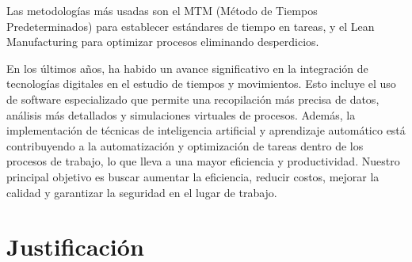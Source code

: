 \begin{itemize}
         Las metodologías más usadas son el MTM (Método de Tiempos Predeterminados) para establecer estándares de tiempo en tareas, y el Lean Manufacturing para optimizar procesos eliminando desperdicios.
        \cite{metodología}
        
         En los últimos años, ha habido un avance significativo en la integración de tecnologías digitales en el estudio de tiempos y movimientos. Esto incluye el uso de software especializado que permite una recopilación más precisa de datos, análisis más detallados y simulaciones virtuales de procesos. Además, la implementación de técnicas de inteligencia artificial y aprendizaje automático está contribuyendo a la automatización y optimización de tareas dentro de los procesos de trabajo, lo que lleva a una mayor eficiencia y productividad.
         Nuestro principal objetivo es buscar aumentar la eficiencia, reducir costos, mejorar la calidad y garantizar la seguridad en el lugar de trabajo. 
         \end{itemize}
    \section{Justificación}
    
